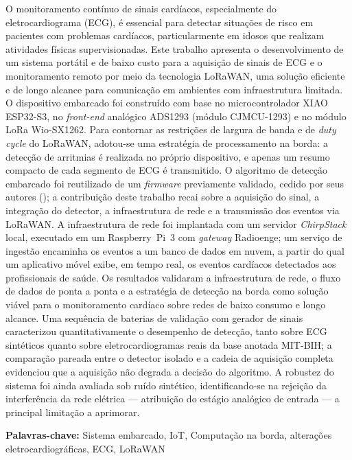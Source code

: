 O monitoramento contínuo de sinais cardíacos, especialmente do eletrocardiograma (ECG), é essencial para detectar situações de risco em pacientes com problemas cardíacos, particularmente em idosos que realizam atividades físicas supervisionadas. Este trabalho apresenta o desenvolvimento de um sistema portátil e de baixo custo para a aquisição de sinais de ECG e o monitoramento remoto por meio da tecnologia LoRaWAN, uma solução eficiente e de longo alcance para comunicação em ambientes com infraestrutura limitada. O dispositivo embarcado foi construído com base no microcontrolador XIAO ESP32-S3, no \textit{front-end} analógico ADS1293 (módulo CJMCU-1293) e no módulo LoRa Wio-SX1262. Para contornar as restrições de largura de banda e de \textit{duty cycle} do LoRaWAN, adotou-se uma estratégia de processamento na borda: a detecção de arritmias é realizada no próprio dispositivo, e apenas um resumo compacto de cada segmento de ECG é transmitido. O algoritmo de detecção embarcado foi reutilizado de um \textit{firmware} previamente validado, cedido por seus autores (); a contribuição deste trabalho recai sobre a aquisição do sinal, a integração do detector, a infraestrutura de rede e a transmissão dos eventos via LoRaWAN. A infraestrutura de rede foi implantada com um servidor \textit{ChirpStack} local, executado em um Raspberry~Pi~3 com \textit{gateway} Radioenge; um serviço de ingestão encaminha os eventos a um banco de dados em nuvem, a partir do qual um aplicativo móvel exibe, em tempo real, os eventos cardíacos detectados aos profissionais de saúde. Os resultados validaram a infraestrutura de rede, o fluxo de dados de ponta a ponta e a estratégia de detecção na borda como solução viável para o monitoramento cardíaco sobre redes de baixo consumo e longo alcance. Uma sequência de baterias de validação com gerador de sinais caracterizou quantitativamente o desempenho de detecção, tanto sobre \acs{ECG} sintéticos quanto sobre eletrocardiogramas reais da base anotada MIT-BIH; a comparação pareada entre o detector isolado e a cadeia de aquisição completa evidenciou que a aquisição não degrada a decisão do algoritmo. A robustez do sistema foi ainda avaliada sob ruído sintético, identificando-se na rejeição da interferência da rede elétrica — atribuição do estágio analógico de entrada — a principal limitação a aprimorar.

\textbf{Palavras-chave:} Sistema embarcado, IoT, Computação na borda, alterações eletrocardiográficas, ECG, LoRaWAN
